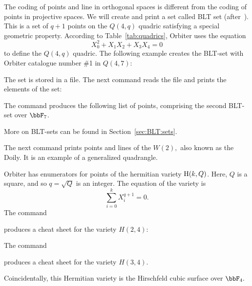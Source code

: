 \bigskip


The coding of points and line in orthogonal spaces 
is different from the coding of points in projective spaces. 
We will create and print a set called BLT set (after~\cite{BaderLunardonThas90}). 
This is a set of $q+1$ points on the $Q(4,q)$ quadric satisfying a special geometric property. 
According to Table~\ref{tab:quadrics}, Orbiter uses the equation 
$$
X_0^2+
X_1X_2+
X_3X_4 = 0
$$
to define the $Q(4,q)$ quadric.
The following example creates the BLT-set with Orbiter catalogue number \#1 in $Q(4,7)$:
{\tt

}
The set is stored in a file.
The next command reads the file and prints the elements of the set:
{\tt

}
The command produces the following list of points, 
comprising the second BLT-set over $\bbF_7$.
\begin{mdframed}[style=MyFrame]

\end{mdframed}
More on BLT-sets can be found in Section~\ref{sec:BLT:sets}.

\bigskip

The next command prints points and lines of the $W(2),$ also known as the Doily.
It is an example of a generalized quadrangle.
{\tt

}

Orbiter has enumerators for points of the hermitian variety ${\rm H}(k,Q)$.
Here, $Q$ is a square, and so $q = \sqrt{Q}$ is an integer. The equation of the variety is 
$$
\sum_{i=0}^k X_i^{q+1} = 0.
$$
The command 
{\tt

}
produces a cheat sheet for the variety $H(2,4)$:\\
\begin{mdframed}[style=MyFrame]

\end{mdframed}

\bigskip

The command 
{\tt

}
produces a cheat sheet for the variety $H(3,4)$.


\bigskip


\begin{mdframed}[style=MyFrame]

\end{mdframed}

\bigskip

Coincidentally, this Hermitian variety is the Hirschfeld cubic surface over $\bbF_4.$


